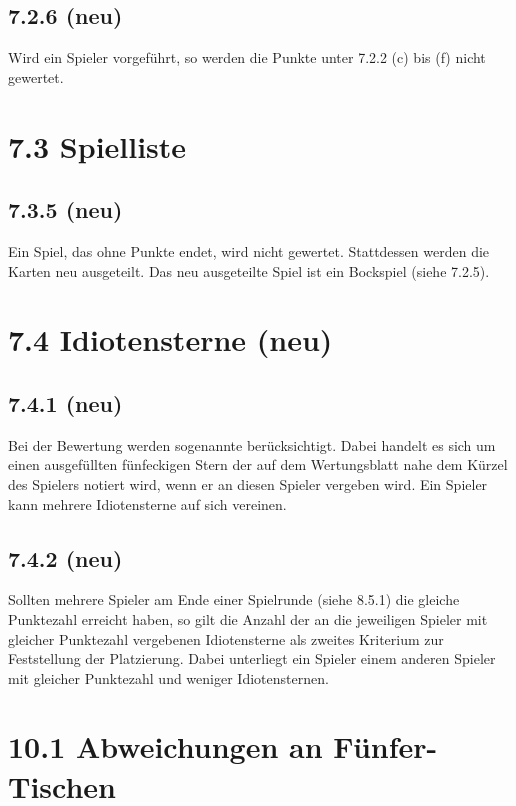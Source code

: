 \subsection*{7.2.6 (neu)}

Wird ein Spieler vorgeführt, so werden die Punkte unter 7.2.2 (c) bis
(f) nicht gewertet.

\section*{7.3 Spielliste}

\subsection*{7.3.5 (neu)}

Ein Spiel, das ohne Punkte endet, wird nicht gewertet. Stattdessen
werden die Karten neu ausgeteilt. Das neu ausgeteilte Spiel ist ein
Bockspiel (siehe 7.2.5).

\section*{7.4 Idiotensterne (neu)}

\subsection*{7.4.1 (neu)}

Bei der Bewertung werden sogenannte  berücksichtigt. Dabei
handelt es sich um einen ausgefüllten fünfeckigen Stern der auf dem
Wertungsblatt nahe dem Kürzel des Spielers notiert wird, wenn er an diesen
Spieler vergeben wird. Ein Spieler kann mehrere Idiotensterne auf sich vereinen.

\subsection*{7.4.2 (neu)}

Sollten mehrere Spieler am Ende einer Spielrunde (siehe 8.5.1) die gleiche
Punktezahl erreicht haben, so gilt die Anzahl der an die jeweiligen Spieler mit
gleicher Punktezahl vergebenen Idiotensterne als zweites Kriterium zur
Feststellung der Platzierung. Dabei unterliegt ein Spieler einem anderen Spieler
mit gleicher Punktezahl und weniger Idiotensternen.

\section*{10.1 Abweichungen an Fünfer-Tischen}

